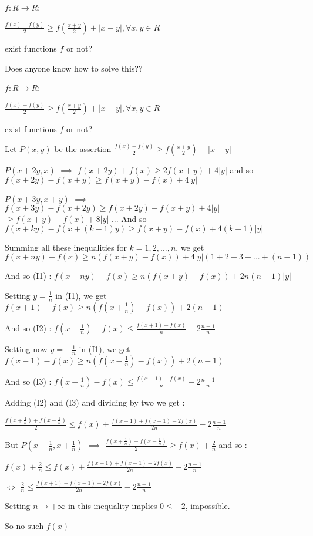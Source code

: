 \begin{solution}
	\begin{tcolorbox}$f: R\to R$:

${\frac{f(x)+f(y)}{2}}\ge f(\frac{x+y}{2})+|x-y|, \forall x,y \in R$

exist functions $f$ or not?\end{tcolorbox}
\end{solution}



\begin{solution}
	Does anyone know how to solve this??
\end{solution}



\begin{solution}
	\begin{tcolorbox}$f: R\to R$:

${\frac{f(x)+f(y)}{2}}\ge f(\frac{x+y}{2})+|x-y|, \forall x,y \in R$

exist functions $f$ or not?\end{tcolorbox}
Let $P(x,y)$ be the assertion $\frac{f(x)+f(y)}2\ge f(\frac{x+y}2)+|x-y|$

$P(x+2y,x)$ $\implies$ $f(x+2y)+f(x)\ge 2f(x+y)+4|y|$ and so $f(x+2y)-f(x+y)\ge f(x+y)-f(x)+4|y|$

$P(x+3y,x+y)$ $\implies$ $f(x+3y)-f(x+2y)\ge f(x+2y)-f(x+y)+4|y|$ $\ge f(x+y)-f(x)+8|y|$
...
And so $f(x+ky)-f(x+(k-1)y)\ge f(x+y)-f(x)+4(k-1)|y|$

Summing all these inequalities for $k=1,2,...,n$, we get $f(x+ny)-f(x)\ge n(f(x+y)-f(x))+4|y|(1+2+3+...+(n-1))$

And so (I1) : $f(x+ny)-f(x)\ge n(f(x+y)-f(x))+2n(n-1)|y|$

Setting $y=\frac 1n$ in (I1), we get $f(x+1)-f(x)\ge n(f(x+\frac 1n)-f(x))+2(n-1)$

And so (I2) : $f(x+\frac 1n)-f(x)\le \frac{f(x+1)-f(x)}{n}-2\frac{n-1}n$

Setting now $y=-\frac 1n$ in (I1), we get $f(x-1)-f(x)\ge n(f(x-\frac 1n)-f(x))+2(n-1)$

And so (I3) : $f(x-\frac 1n)-f(x)\le \frac{f(x-1)-f(x)}{n}-2\frac{n-1}n$

Adding (I2) and (I3) and dividing by two we get  : 

$\frac{f(x+\frac 1n)+f(x-\frac 1n)}2\le f(x)+\frac{f(x+1)+f(x-1)-2f(x)}{2n}-2\frac{n-1}n$

But $P(x-\frac 1n,x+\frac 1n)$ $\implies$ $\frac{f(x+\frac 1n)+f(x-\frac 1n)}2\ge f(x)+\frac 2n$ and so :

$f(x)+\frac 2n\le f(x)+\frac{f(x+1)+f(x-1)-2f(x)}{2n}-2\frac{n-1}n$

$\iff$ $\frac 2n\le \frac{f(x+1)+f(x-1)-2f(x)}{2n}-2\frac{n-1}n$

Setting $n\to +\infty$ in this inequality implies $0\le -2$, impossible.

So $\boxed{\text{no such }f(x)}$
\end{solution}



